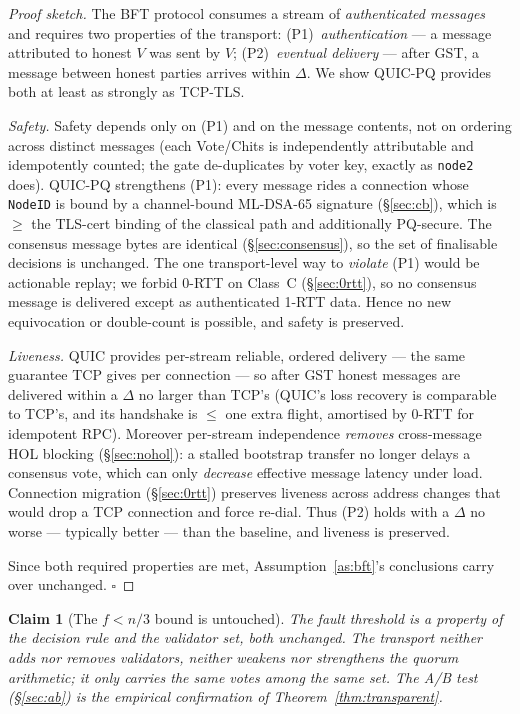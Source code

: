 \documentclass[11pt,a4paper]{article}
\newcommand{\msg}[1]{\textsf{#1}}
\newcommand{\code}[1]{\texttt{#1}}
\newtheorem{claim}{Claim}
\begin{document}
\begin{proof}[Proof sketch]
The BFT protocol consumes a stream of \emph{authenticated messages} and
requires two properties of the transport: (P1)~\emph{authentication} ---
a message attributed to honest $V$ was sent by $V$; (P2)~\emph{eventual
delivery} --- after GST, a message between honest parties arrives within
$\Delta$. We show QUIC-PQ provides both at least as strongly as
TCP-TLS.

\emph{Safety.} Safety depends only on (P1) and on the message contents,
not on ordering across distinct messages (each \msg{Vote}/\msg{Chits} is
independently attributable and idempotently counted; the gate
de-duplicates by voter key, exactly as \code{node2} does). QUIC-PQ
strengthens (P1): every message rides a connection whose \code{NodeID} is
bound by a channel-bound ML-DSA-65 signature (\S\ref{sec:cb}), which is
$\ge$ the TLS-cert binding of the classical path and additionally
PQ-secure. The consensus message bytes are identical (\S\ref{sec:consensus}),
so the set of finalisable decisions is unchanged. The one transport-level
way to \emph{violate} (P1) would be actionable replay; we forbid 0-RTT
on Class~C (\S\ref{sec:0rtt}), so no consensus message is delivered
except as authenticated 1-RTT data. Hence no new equivocation or
double-count is possible, and safety is preserved.

\emph{Liveness.} QUIC provides per-stream reliable, ordered delivery ---
the same guarantee TCP gives per connection --- so after GST honest
messages are delivered within a $\Delta$ no larger than TCP's (QUIC's
loss recovery is comparable to TCP's, and its handshake is $\le$ one
extra flight, amortised by 0-RTT for idempotent RPC). Moreover per-stream
independence \emph{removes} cross-message HOL blocking (\S\ref{sec:nohol}):
a stalled bootstrap transfer no longer delays a consensus vote, which can
only \emph{decrease} effective message latency under load. Connection
migration (\S\ref{sec:0rtt}) preserves liveness across address changes
that would drop a TCP connection and force re-dial. Thus (P2) holds with
a $\Delta$ no worse --- typically better --- than the baseline, and
liveness is preserved.

Since both required properties are met, Assumption~\ref{as:bft}'s
conclusions carry over unchanged. $\square$
\end{proof}

\begin{claim}[The $f<n/3$ bound is untouched]
The fault threshold is a property of the \emph{decision rule} and the
\emph{validator set}, both unchanged. The transport neither adds nor
removes validators, neither weakens nor strengthens the quorum
arithmetic; it only carries the same votes among the same set. The
A/B test (\S\ref{sec:ab}) is the empirical confirmation of
Theorem~\ref{thm:transparent}.
\end{claim}
\end{document}
